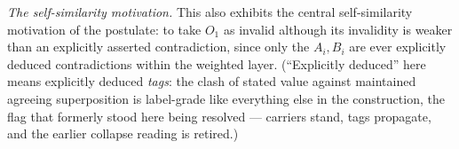 
\textit{The self-similarity motivation.} This also exhibits the central self-similarity motivation of the postulate: to take $O_1$ as invalid although its invalidity is weaker than an explicitly asserted contradiction, since only the $A_i, B_i$ are ever explicitly deduced contradictions within the weighted layer. (``Explicitly deduced'' here means explicitly deduced \emph{tags}: the clash of stated value against maintained agreeing superposition is label-grade like everything else in the construction, the flag that formerly stood here being resolved --- carriers stand, tags propagate, and the earlier collapse reading is retired.)

